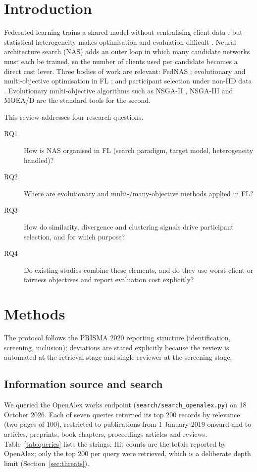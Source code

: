 \documentclass[11pt,a4paper]{article}
\begin{document}
\section{Introduction}
Federated learning trains a shared model without centralising client data \cite{mcmahan2017fedavg}, but statistical heterogeneity makes optimisation and evaluation difficult \cite{kairouz2021advances}. Neural architecture search (NAS) adds an outer loop in which many candidate networks must each be trained, so the number of clients used per candidate becomes a direct cost lever. Three bodies of work are relevant: FedNAS \cite{zhu2021from}; evolutionary and multi-objective optimisation in FL \cite{hartmann2025multiobjective}; and participant selection under non-IID data \cite{smestad2023a}. Evolutionary multi-objective algorithms such as NSGA-II \cite{deb2002nsga2}, NSGA-III \cite{deb2014nsga3} and MOEA/D \cite{zhang2007moead} are the standard tools for the second.

This review addresses four research questions.
\begin{description}
\item[RQ1] How is NAS organised in FL (search paradigm, target model, heterogeneity handled)?
\item[RQ2] Where are evolutionary and multi-/many-objective methods applied in FL?
\item[RQ3] How do similarity, divergence and clustering signals drive participant selection, and for which purpose?
\item[RQ4] Do existing studies combine these elements, and do they use worst-client or fairness objectives and report evaluation cost explicitly?
\end{description}

\section{Methods}\label{sec:methods}
The protocol follows the PRISMA 2020 reporting structure (identification, screening, inclusion); deviations are stated explicitly because the review is automated at the retrieval stage and single-reviewer at the screening stage.

\subsection{Information source and search}
We queried the OpenAlex works endpoint (\texttt{search/search\_openalex.py}) on 18 October 2026. Each of seven queries returned its top 200 records by relevance (two pages of 100), restricted to publications from 1 January 2019 onward and to articles, preprints, book chapters, proceedings articles and reviews. Table~\ref{tab:queries} lists the strings. Hit counts are the totals reported by OpenAlex; only the top 200 per query were retrieved, which is a deliberate depth limit (Section~\ref{sec:threats}).
\end{document}
